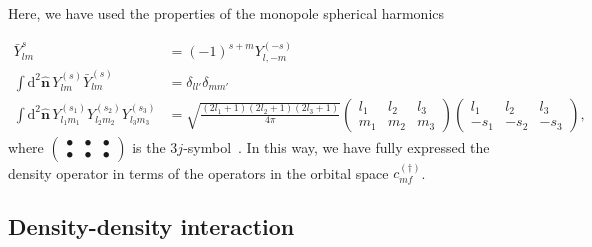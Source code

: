 \documentclass{timesjhep}
\begin{document}
Here, we have used the properties of the monopole spherical harmonics~\cite{Wu1977Monopole,Shnir2005Monopole}

\begin{subequations}
\begin{align}
    \bar{Y}_{lm}^{s}&=(-1)^{s+m}Y_{l,-m}^{(-s)}\\
    \int\mathrm{d}^2\hat{\mathbf{n}}\,Y_{lm}^{(s)}\bar{Y}_{lm}^{(s)}&=\delta_{ll'}\delta_{mm'}\\
    \int\mathrm{d}^2\hat{\mathbf{n}}\,Y_{l_1m_1}^{(s_1)}Y_{l_2m_2}^{(s_2)}Y_{l_3m_3}^{(s_3)}&=\sqrt{\frac{(2l_1+1)(2l_2+1)(2l_3+1)}{4\pi}}\begin{pmatrix}l_1&l_2&l_3\\m_1&m_2&m_3\end{pmatrix}\begin{pmatrix}l_1&l_2&l_3\\-s_1&-s_2&-s_3\end{pmatrix},
\end{align}
\end{subequations}
where $\left(\begin{smallmatrix}\bullet&\bullet&\bullet\\\bullet&\bullet&\bullet\end{smallmatrix}\right)$ is the $3j$-symbol~\cite{Biedenharn1984Angular}. In this way, we have fully expressed the density operator in terms of the operators in the orbital space $c^{(\dagger)}_{mf}$.

\subsection{Density-density interaction}
\label{sec:construct_denint}
\end{document}
